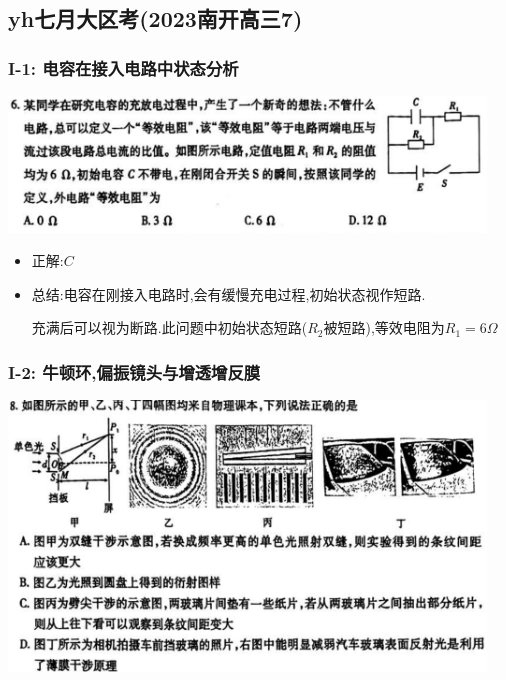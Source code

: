 \documentclass{article}
\begin{document}
\vspace{2em}

\subsection{yh七月大区考(2023南开高三7)}

\subsubsection{I-1: 电容在接入电路中状态分析}
\includegraphics[width=0.95\textwidth,keepaspectratio]{./pictures/3.13-1.png}

\begin{itemize}
    \item 正解:\quad $C$
    \item 总结:\quad 电容在刚接入电路时,会有缓慢充电过程,初始状态视作短路.
    
    \hspace{3.2em}充满后可以视为断路.此问题中初始状态短路($R_{2}$被短路),等效电阻为$R_{1} = 6 \Omega $    
\end{itemize}

\vspace{2em}

\subsubsection{I-2: 牛顿环,偏振镜头与增透增反膜}
\includegraphics[width=0.95\textwidth,keepaspectratio]{./pictures/3.13-2.png}
\end{document}
